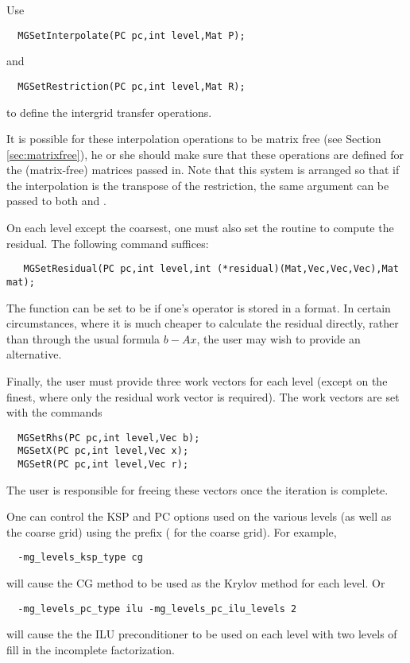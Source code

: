 Use
\begin{verbatim}
  MGSetInterpolate(PC pc,int level,Mat P);
\end{verbatim}
and
\begin{verbatim}
  MGSetRestriction(PC pc,int level,Mat R);
\end{verbatim}
to define the intergrid transfer operations.

It is possible for these interpolation operations to be matrix free
(see Section \ref{sec:matrixfree}),
he or she should make sure that these operations are defined for the (matrix-free) matrices
passed in. 
Note that this system is arranged so that if the interpolation is 
the transpose of the restriction, the same  argument can be 
passed to both  and .

On each level except the coarsest, one must also set the routine to 
compute the residual.  The following command suffices: 
\begin{verbatim}
   MGSetResidual(PC pc,int level,int (*residual)(Mat,Vec,Vec,Vec),Mat mat);
\end{verbatim}
The  function can be set to be 
if 
one's operator is stored in a  format.  In certain circumstances, 
where it is much cheaper to calculate the residual directly, rather 
than through the usual formula $b - Ax$,  the user may wish to provide 
an alternative. 

Finally, the user must provide three work vectors for each level 
(except on the finest, where only the residual work vector is required).
The work vectors are set with the 
commands    
\begin{verbatim}
  MGSetRhs(PC pc,int level,Vec b);
  MGSetX(PC pc,int level,Vec x);
  MGSetR(PC pc,int level,Vec r);
\end{verbatim}
The user is responsible for freeing these vectors once the iteration 
is complete.

One can control the KSP and PC options used on the various levels
(as well as the coarse grid) using the prefix  (
 for the coarse grid).
 For example,
\begin{verbatim}
  -mg_levels_ksp_type cg
\end{verbatim}
will cause the CG method to be used as the Krylov method for each level.
Or
\begin{verbatim}
  -mg_levels_pc_type ilu -mg_levels_pc_ilu_levels 2
\end{verbatim}
will cause the the ILU preconditioner to be used on each level with 
two levels of fill in the incomplete factorization.



